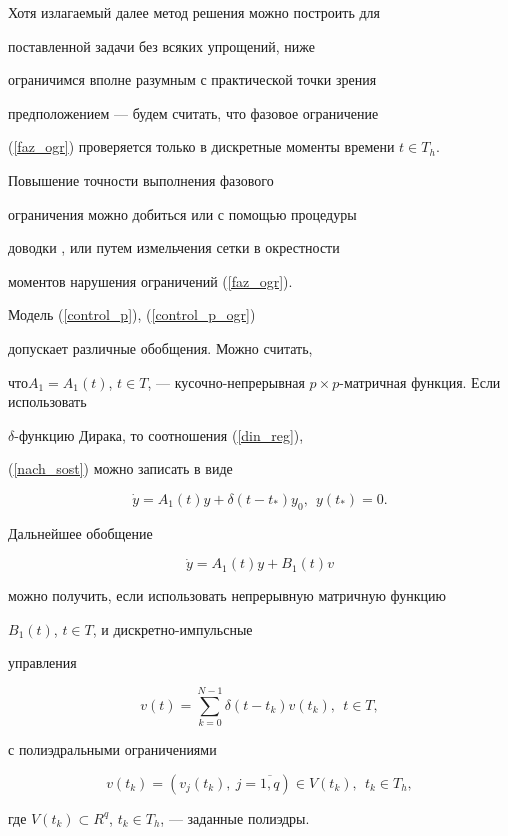 Хотя излагаемый далее метод решения можно построить для


поставленной задачи без всяких упрощений, ниже


ограничимся вполне разумным с практической точки зрения


предположением --- будем считать, что фазовое ограничение


(\ref{faz_ogr}) проверяется только в дискретные моменты времени $t


\in T_h$.





\begin{note}


Повышение точности выполнения фазового


ограничения можно добиться или с помощью процедуры


доводки \cite{KMO2}, или путем измельчения сетки в окрестности


моментов нарушения ограничений (\ref{faz_ogr}).


\end{note}





\begin{note}


Модель (\ref{control_p}), (\ref{control_p_ogr})


допускает различные обобщения. Можно считать,


что\linebreak $A_1 = A_1(t)$, $t \in T$, --- кусочно-непрерывная $p \times


p$-матричная функция. Если использовать


$\delta$-функцию Дирака, то соотношения (\ref{din_reg}),


(\ref{nach_sost}) можно записать в виде


$$


\Dot{y} = A_1(t)y + \delta(t-t_*)y_0, \ \ y(t_*) = 0.


$$


Дальнейшее обобщение


$$


\Dot{y} = A_1(t)y + B_1(t)v


$$


можно получить, если использовать непрерывную матричную функцию


$B_1(t)$, $t \in T$, и дискретно-импульсные


управления


$$


v(t) = \sum\limits_{k=0}^{N-1} \delta (t-t_k) v(t_k), \ \ t \in T,


$$


с полиэдральными ограничениями


$$


v(t_k) = (v_j(t_k), \ j=\overline{1,q}) \in V(t_k), \ \ t_k \in T_h,


$$


где $V(t_k) \subset R^q$, $t_k \in T_h$, --- заданные полиэдры.


\end{note}





